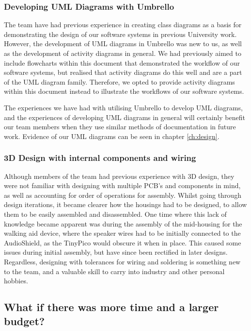             \subsubsection{Developing UML Diagrams with Umbrello}

                The team have had previous experience in creating class diagrams as a basis for demonstrating the design of our software systems in previous University work. However, the development of UML diagrams in Umbrello was new to us, as well as the development of activity diagrams in general. We had previously aimed to include flowcharts within this document that demonstrated the workflow of our software systems, but realised that activity diagrams do this well and are a part of the UML diagram family. Therefore, we opted to provide activity diagrams within this document instead to illustrate the workflows of our software systems.

                The experiences we have had with utilising Umbrello to develop UML diagrams, and the experiences of developing UML diagrams in general will certainly benefit our team members when they use similar methods of documentation in future work. Evidence of our UML diagrams can be seen in chapter \ref{ch:design}.

            \subsubsection{3D Design with internal components and wiring}

                Although members of the team had previous experience with 3D design, they were not familiar with designing with multiple PCB's and components in mind, as well as accounting for order of operations for assembly. Whilst going through design iterations, it became clearer how the housings had to be designed, to allow them to be easily assembled and disassembled. One time where this lack of knowledge became apparent was during the assembly of the mid-housing for the walking aid device, where the speaker wires had to be initially connected to the AudioShield, as the TinyPico would obscure it when in place. This caused some issues during initial assembly, but have since been rectified in later designs. Regardless, designing with tolerances for wiring and soldering is something new to the team, and a valuable skill to carry into industry and other personal hobbies.
                
        \subsection{What if there was more time and a larger budget?}


